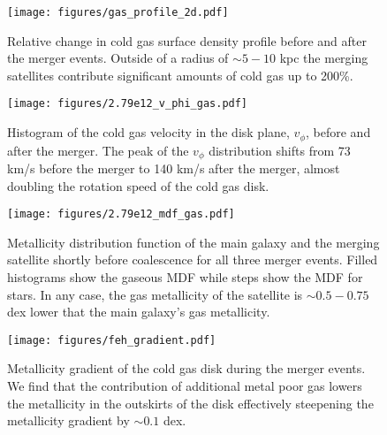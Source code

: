 \documentclass[useAMS,usenatbib]{mnras}
\begin{document}
\begin{figure}
    \begin{centering}
        \texttt{[image: figures/gas\_profile\_2d.pdf]}
        \caption{
            Relative change in cold gas surface density profile before and after the merger events. Outside of a radius of $\sim5-10$ kpc the merging satellites contribute significant amounts of cold gas up to 200\%.
        }
        \label{fig:surf_den}
    \end{centering}
\end{figure}


\begin{figure}
    \begin{centering}
        \texttt{[image: figures/2.79e12\_v\_phi\_gas.pdf]}
        \caption{
            Histogram of the cold gas velocity in the disk plane, $v_\phi$, before and after the merger. The peak of the $v_\phi$ distribution shifts from 73 km/s before the merger to 140 km/s after the merger, almost doubling the rotation speed of the cold gas disk.
        }
        \label{fig:v_phi}
    \end{centering}
\end{figure}


\begin{figure*}
    \begin{centering}
        \texttt{[image: figures/2.79e12\_mdf\_gas.pdf]}
        \caption{
            Metallicity distribution function of the main galaxy and the merging satellite shortly before coalescence for all three merger events. Filled histograms show the gaseous MDF while steps show the MDF for stars. In any case, the gas metallicity of the satellite is $\sim0.5-0.75$ dex lower that the main galaxy's gas metallicity.
        }
        \label{fig:mdf}
    \end{centering}
\end{figure*}


\begin{figure}
    \begin{centering}
        \texttt{[image: figures/feh\_gradient.pdf]}
        \caption{
            Metallicity gradient of the cold gas disk during the merger events. We find that the contribution of additional metal poor gas lowers the metallicity in the outskirts of the disk effectively steepening the metallicity gradient by $\sim 0.1$ dex.
        }
        \label{fig:feh_grad}
    \end{centering}
\end{figure}
\end{document}
